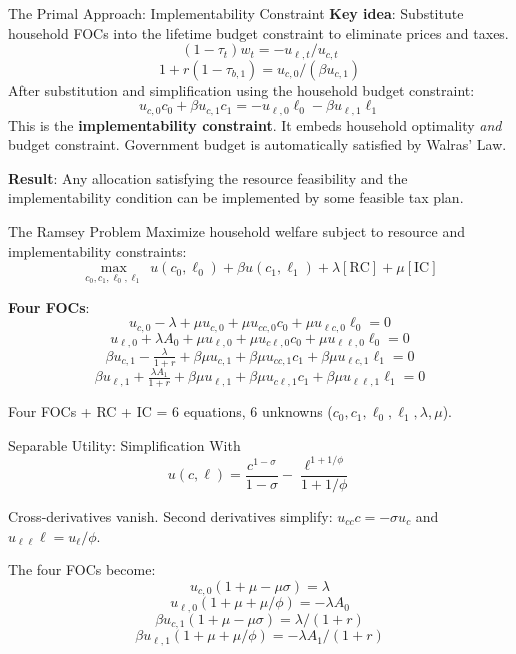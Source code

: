 \documentclass[blue]{beamer}
\begin{document}
\begin{frame}{The Primal Approach: Implementability Constraint}
	\textbf{Key idea}: Substitute household FOCs into the lifetime budget constraint to eliminate prices and taxes.
	$$
	 (1-\tau_t)w_t = -u_{\ell,t}/u_{c,t}
	 $$
	$$
	1+r(1-\tau_{b,1}) = u_{c,0}/(\beta u_{c,1})
	$$
	After substitution and simplification using the household budget constraint:
	\[
	{u_{c,0} c_0 + \beta u_{c,1} c_1 = -u_{\ell,0} \ell_0 - \beta u_{\ell,1} \ell_1}
	\]
	This is the \textbf{implementability constraint}. It embeds household optimality \emph{and} budget constraint. Government budget is automatically satisfied by Walras' Law.

	\textbf{Result}: Any allocation satisfying the resource feasibility and the implementability condition can be implemented by some feasible tax plan.
\end{frame}


\begin{frame}{The Ramsey Problem}
	Maximize household welfare subject to resource and implementability constraints:
	\[
	\max_{c_0, c_1, \ell_0, \ell_1}\; u(c_0, \ell_0) + \beta u(c_1, \ell_1) + \lambda[\text{RC}] + \mu[\text{IC}]
	\]
	
	\textbf{Four FOCs}:
$$
		u_{c,0} - \lambda + \mu u_{c,0} + \mu u_{cc,0} c_0 + \mu u_{\ell c,0} \ell_0 = 0 
		$$
		$$
		u_{\ell,0} + \lambda A_0 + \mu u_{\ell,0} + \mu u_{c\ell,0} c_0 + \mu u_{\ell\ell,0} \ell_0 = 0 
		$$
		$$
		\beta u_{c,1} - \tfrac{\lambda}{1+r} + \beta\mu u_{c,1} + \beta\mu u_{cc,1} c_1 + \beta\mu u_{\ell c,1} \ell_1 = 0 
		$$
		$$
		\beta u_{\ell,1} + \tfrac{\lambda A_1}{1+r} + \beta\mu u_{\ell,1} + \beta\mu u_{c\ell,1} c_1 + \beta\mu u_{\ell\ell,1} \ell_1 = 0
		$$
		
	Four FOCs + RC + IC = 6 equations, 6 unknowns ($c_0, c_1, \ell_0, \ell_1, \lambda, \mu$).
\end{frame}

\begin{frame}{Separable Utility: Simplification}
	With 
	$$
	u(c,\ell) = \frac{c^{1-\sigma}}{1-\sigma} - \frac{\ell^{1+1/\phi}}{1+1/\phi}
	$$
	
	Cross-derivatives vanish. Second derivatives simplify: $u_{cc} c = -\sigma u_c$ and $u_{\ell\ell} \ell = u_\ell / \phi$.
	
	\bigskip
	The four FOCs become:
$$
		u_{c,0}(1+\mu - \mu\sigma) = \lambda 
		$$
			$$
		u_{\ell,0}(1+\mu + \mu/\phi) = -\lambda A_0 
		$$
		$$
		\beta u_{c,1}(1+\mu - \mu\sigma) = \lambda/(1+r) 
		$$
		$$
		\beta u_{\ell,1}(1+\mu + \mu/\phi) = -\lambda A_1/(1+r)
	$$
\end{frame}
\end{document}
